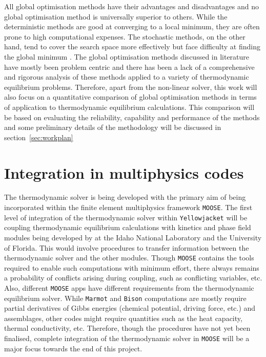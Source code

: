 	  All global optimisation methods have their advantages and disadvantages and no global optimisation method is universally superior to others. While the deterministic methods are good at converging to a local minimum, they are often prone to high computational expenses. The stochastic methods, on the other hand, tend to cover the search space more effectively but face difficulty at finding the global minimum \cite{Piro16}. The global optimisation methods discussed in literature have mostly been problem centric and there has been a lack of a comprehensive and rigorous analysis of these methods applied to a variety of thermodynamic equilibrium problems. Therefore, apart from the non-linear solver, this work will also focus on a quantitative comparison of global optimisation methods in terms of application to thermodynamic equilibrium calculations. This comparison will be based on evaluating the reliability, capability and performance of the methods and some preliminary details of the methodology will be discussed in section~\ref{sec:workplan}
	 
	 
\section{Integration in multiphysics codes}
	The thermodynamic solver is being developed with the primary aim of being incorporated within the  finite element multiphysics framework \texttt{MOOSE}. The first level of integration of the thermodynamic solver within \texttt{Yellowjacket} will be coupling thermodynamic equilibrium calculations with kinetics and phase field modules being developed by at the Idaho National Laboratory and the University of Florida. This would involve procedures to transfer information between the thermodynamic solver and the other modules. Though  \texttt{MOOSE} contains the tools required to enable such computations with minimum effort, there always remains a probability of conflicts arising during coupling, such as conflicting variables, etc. Also, different \texttt{MOOSE} apps have different requirements from the thermodynamic equilibrium solver. While \texttt{Marmot} and \texttt{Bison} computations are mostly require partial derivatives of Gibbs energies (chemical potential, driving force, etc.) and assemblages, other codes might require quantities such as the heat capacity, thermal conductivity, etc.  Therefore, though the procedures have not yet been finalised, complete integration of the thermodynamic solver in \texttt{MOOSE} will be a major focus towards the end of this project. 
	
